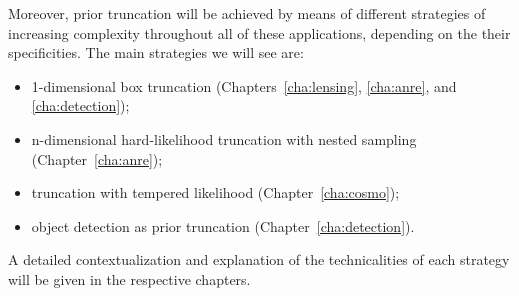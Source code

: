 Moreover, prior truncation will be achieved by means of different strategies of increasing complexity throughout all of these applications, depending on the their specificities. The main strategies we will see are:
\begin{itemize}[leftmargin=1cm]
	\item 1-dimensional box truncation (Chapters~\ref{cha:lensing}, \ref{cha:anre}, and \ref{cha:detection});
	\item n-dimensional hard-likelihood truncation with nested sampling  (Chapter~\ref{cha:anre});
	\item truncation with tempered likelihood  (Chapter~\ref{cha:cosmo});
	\item object detection as prior truncation  (Chapter~\ref{cha:detection}).
\end{itemize}

A detailed contextualization and explanation of the technicalities of each strategy will be given in the respective chapters. 







